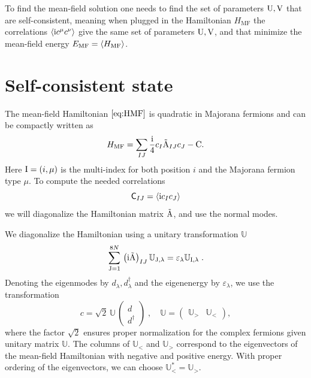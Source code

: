 To find the mean-field solution one needs to find the set of parameters $\mathrm{U}, \mathrm{V}$ that are self-consistent, meaning when plugged in the Hamiltonian $H_{\mathrm{MF}}$ the correlations $\braket{\mathrm{i} c^\mu c^\nu}$ give the same set of parameters $\mathrm{U}, \mathrm{V}$, and that minimize the mean-field energy $E_{\mathrm{MF}}=\braket{H_{\mathrm{MF}}}$.


\section{Self-consistent state}

The mean-field Hamiltonian $\eqref{eq:HMF}$ is quadratic in Majorana fermions and can be compactly written as
\begin{equation}
    H_{\mathrm{MF}}=\sum_{IJ}  \frac{\mathrm{i}}{4} c_I   \tilde{\mathrm{A}}_{IJ} c_J-\mathrm{C} . \label{eq:HMF-2}
\end{equation}
Here ${\mathrm{I}}=(i,\mu)$ is the multi-index for both position $i$ and the Majorana fermion type $\mu$.
To compute the needed correlations
\begin{equation}
    {\mathsf{C}}_{IJ}=\braket{ \mathrm{i} c_I c_J}
\end{equation}
we will diagonalize the Hamiltonian matrix $\tilde{\mathrm{A}}$, and use the normal modes.

We diagonalize the Hamiltonian using a unitary transformation $\mathbb{U}$
\begin{equation}
    \sum_{{\mathrm{J}}=1}^{8 N} \, \big( \mathrm{i} \tilde{\mathrm{A}} \big)_{IJ} \, \mathbb{U}_{{\mathrm{J}},\lambda} = \varepsilon_\lambda \mathbb{U}_{{\mathrm{I}},\lambda} \; .
\end{equation}
Denoting the eigenmodes by $d_\lambda^{\phantom{\dagger}}, d_\lambda^\dagger$ and the eigenenergy by $\varepsilon_\lambda$,
we use the transformation
\begin{equation}
    c = \sqrt{2} \, \mathbb{U} \, \left( \begin{array}{c}  d^{\phantom{\dagger}} \\ d^\dagger \end{array} \right)   \; , \quad
    \mathbb{U} = \left( \begin{array}{cc} \mathbb{U}_{>} & \mathbb{U}_{<}
    \end{array}\right) ,
\end{equation}
where the factor $\sqrt{2}$ ensures proper normalization for the complex fermions given unitary matrix $\mathbb{U} $.  The columns of $\mathbb{U}_{<}$
 and $\mathbb{U}_{>}$  correspond to the eigenvectors of the mean-field Hamiltonian with negative and positive energy. With proper ordering of the eigenvectors, we can choose $\mathbb{U}_{<}^{\ast}=\mathbb{U}_{>}$.


